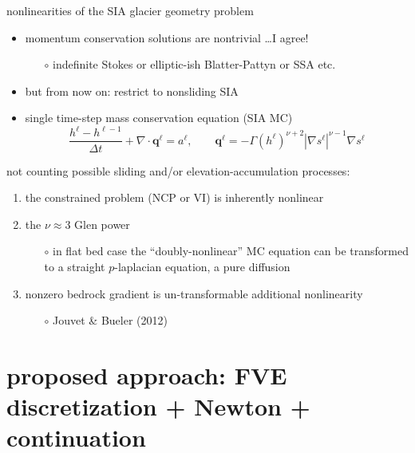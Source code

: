 \documentclass[xcolor={dvipsnames}]{beamer}
\newcommand\bq{\mathbf{q}}
\newcommand\Div{\nabla\cdot}
\newcommand\grad{\nabla}
\begin{document}
\begin{frame}{nonlinearities of the SIA glacier geometry problem}

\begin{itemize}
\item momentum conservation solutions are nontrivial \dots I agree!
    \begin{itemize}
    \item[$\circ$] indefinite Stokes or elliptic-ish Blatter-Pattyn or SSA etc.
    \end{itemize}
\item but from now on: restrict to nonsliding SIA
\item single time-step mass conservation equation (SIA MC)
    $$\frac{h^\ell - h^{\ell-1}}{\Delta t} + \Div \bq^\ell = a^\ell, \qquad \bq^\ell = - \Gamma (h^\ell)^{\nu+2} |\grad s^\ell|^{\nu-1} \grad s^\ell$$
\end{itemize}

not counting possible sliding and/or elevation-accumulation processes:
\begin{enumerate}
\item the constrained problem (NCP or VI) is inherently nonlinear
\item the $\nu\approx 3$ Glen power
    \begin{itemize}
    \item[$\circ$] in flat bed case the ``doubly-nonlinear'' MC equation can be transformed to a straight $p$-laplacian equation, a pure diffusion
    \end{itemize}
\item nonzero bedrock gradient is un-transformable additional nonlinearity
    \begin{itemize}
    \item[$\circ$] Jouvet \& Bueler (2012)
    \end{itemize}
\end{enumerate}
\end{frame}


\section{proposed approach: FVE discretization + Newton + continuation}
\end{document}
